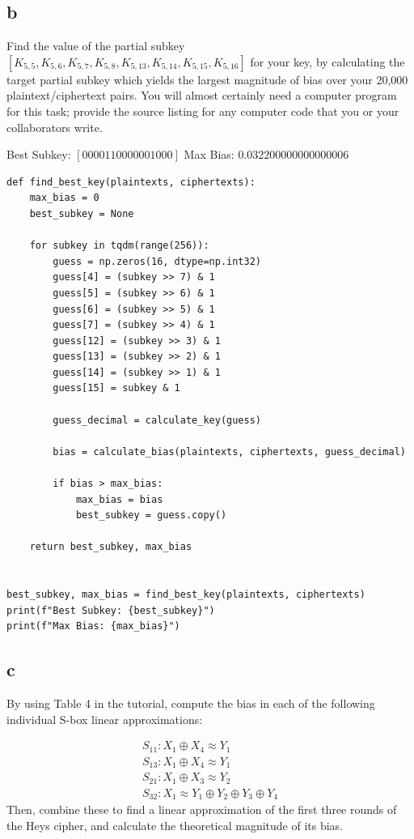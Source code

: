 \documentclass[11pt]{article}
\begin{document}
\subsection{b}

Find the value of the partial subkey $[K_{5,5}, K_{5,6}, K_{5,7}, K_{5,8}, K_{5,13}, K_{5,14}, K_{5,15}, K_{5,16}]$ for your key, by calculating the target partial subkey which yields the largest magnitude of bias over your 20,000 plaintext/ciphertext pairs. You will almost certainly need a computer program for this task; provide the source listing for any computer code that you or your collaborators write.

Best Subkey: $[0 0 0 0 1 1 0 0 0 0 0 0 1 0 0 0]$
Max Bias: $0.032200000000000006$

\begin{verbatim}
def find_best_key(plaintexts, ciphertexts):
    max_bias = 0
    best_subkey = None

    for subkey in tqdm(range(256)):
        guess = np.zeros(16, dtype=np.int32)
        guess[4] = (subkey >> 7) & 1
        guess[5] = (subkey >> 6) & 1
        guess[6] = (subkey >> 5) & 1
        guess[7] = (subkey >> 4) & 1
        guess[12] = (subkey >> 3) & 1
        guess[13] = (subkey >> 2) & 1
        guess[14] = (subkey >> 1) & 1
        guess[15] = subkey & 1

        guess_decimal = calculate_key(guess)

        bias = calculate_bias(plaintexts, ciphertexts, guess_decimal)

        if bias > max_bias:
            max_bias = bias
            best_subkey = guess.copy()

    return best_subkey, max_bias


best_subkey, max_bias = find_best_key(plaintexts, ciphertexts)
print(f"Best Subkey: {best_subkey}")
print(f"Max Bias: {max_bias}")
\end{verbatim}

\subsection{c}

By using Table 4 in the tutorial, compute the bias in each of the following individual S-box linear approximations:

\begin{align*}
    S_{11} : X_{1} \oplus X_{4} \approx Y_{1} \\
    S_{13} : X_{1} \oplus X_{4} \approx Y_{1} \\
    S_{21} : X_{1} \oplus X_{3} \approx Y_{2} \\
    S_{32} : X_{1} \approx Y_{1} \oplus Y_{2} \oplus Y_{3} \oplus Y_{4}   
\end{align*}
Then, combine these to ﬁnd a linear approximation of the ﬁrst three rounds of the Heys cipher,
and calculate the theoretical magnitude of its bias.
\end{document}
